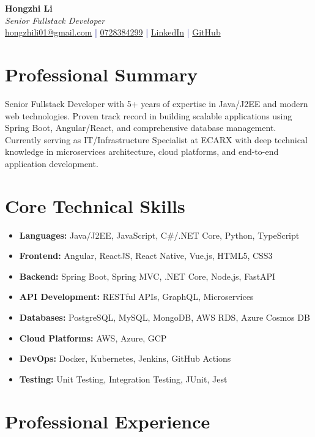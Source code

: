 \documentclass[11pt,a4paper]{article}
\begin{document}
\pagestyle{empty} %

\begin{center}
{\LARGE \textbf{Hongzhi Li}}\\[10pt]
{\Large \textit{Senior Fullstack Developer}}\\[10pt]
\textcolor{darkblue}{\href{mailto:hongzhili01@gmail.com}{hongzhili01@gmail.com} | \href{tel:0728384299}{0728384299} | \href{https://www.linkedin.com/in/harvad/}{LinkedIn} | \href{https://github.com/bluehawana}{GitHub}}
\end{center}

\section*{Professional Summary}
Senior Fullstack Developer with 5+ years of expertise in Java/J2EE and modern web technologies. Proven track record in building scalable applications using Spring Boot, Angular/React, and comprehensive database management. Currently serving as IT/Infrastructure Specialist at ECARX with deep technical knowledge in microservices architecture, cloud platforms, and end-to-end application development.

\section*{Core Technical Skills}
\begin{itemize}[noitemsep]
\item \textbf{Languages:} Java/J2EE, JavaScript, C\#/.NET Core, Python, TypeScript
\item \textbf{Frontend:} Angular, ReactJS, React Native, Vue.js, HTML5, CSS3
\item \textbf{Backend:} Spring Boot, Spring MVC, .NET Core, Node.js, FastAPI
\item \textbf{API Development:} RESTful APIs, GraphQL, Microservices
\item \textbf{Databases:} PostgreSQL, MySQL, MongoDB, AWS RDS, Azure Cosmos DB
\item \textbf{Cloud Platforms:} AWS, Azure, GCP
\item \textbf{DevOps:} Docker, Kubernetes, Jenkins, GitHub Actions
\item \textbf{Testing:} Unit Testing, Integration Testing, JUnit, Jest
\end{itemize}

\section*{Professional Experience}
\end{document}
